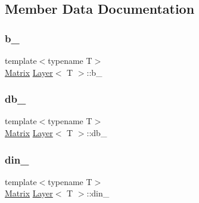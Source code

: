 \subsection{Member Data Documentation}
\mbox{\label{class_layer_ab200edbfbb0a0a7ee305d1371feb2815}} 
\subsubsection{\texorpdfstring{b\_}{b\_}}
{\footnotesize\ttfamily template$<$typename T$>$ \\
\mbox{\hyperlink{class_layer_a22b1e7286096aa62bd245536c8ebdaf1}{Matrix}} \mbox{\hyperlink{class_layer}{Layer}}$<$ T $>$\+::b\+\_\+\hspace{0.3cm}{\ttfamily [protected]}}

\mbox{\label{class_layer_a4ff69fa1c45333cbef24f12d190f26a5}} 
\subsubsection{\texorpdfstring{db\_}{db\_}}
{\footnotesize\ttfamily template$<$typename T$>$ \\
\mbox{\hyperlink{class_layer_a22b1e7286096aa62bd245536c8ebdaf1}{Matrix}} \mbox{\hyperlink{class_layer}{Layer}}$<$ T $>$\+::db\+\_\+\hspace{0.3cm}{\ttfamily [protected]}}

\mbox{\label{class_layer_adcac12db650e05e0e5c664c304231604}} 
\subsubsection{\texorpdfstring{din\_}{din\_}}
{\footnotesize\ttfamily template$<$typename T$>$ \\
\mbox{\hyperlink{class_layer_a22b1e7286096aa62bd245536c8ebdaf1}{Matrix}} \mbox{\hyperlink{class_layer}{Layer}}$<$ T $>$\+::din\+\_\+\hspace{0.3cm}{\ttfamily [protected]}}

\mbox{\label{class_layer_ab02d1e3e853bef3aadffc312ba847f44}} 

